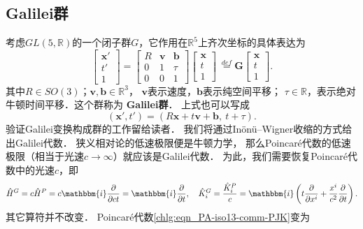\subsection{Galilei群}\label{chlg:sec_Galilei-group}
考虑$GL(5, \mathbb{R})$的一个闭子群$G$，它作用在$\mathbb{R}^5$上齐次坐标的具体表达为
\begin{equation}\label{chlg:eqn_Galilei-max}
    \begin{bmatrix}  \boldsymbol{x}' \\ t'\\ 1 \end{bmatrix} =
    \begin{bmatrix}  R & \boldsymbol{v} & \boldsymbol{b} \\0 & 1 & \tau \\ 0 &0 & 1  \end{bmatrix}
    \begin{bmatrix}  \boldsymbol{x} \\t\\ 1 \end{bmatrix} 
    \  \overset{def}{=} \boldsymbol{G} \begin{bmatrix}  \boldsymbol{x} \\ t\\ 1 \end{bmatrix} .
\end{equation}
其中$R \in S O(3)$；$\boldsymbol{v}, \boldsymbol{b} \in \mathbb{R}^3$，
$\boldsymbol{v}$表示速度，$\boldsymbol{b}$表示纯空间平移；
$\tau \in \mathbb{R}$，表示绝对牛顿时间平移．这个群称为 {\heiti\bfseries Galilei群}．
上式也可以写成
\begin{equation}
    (\boldsymbol{x}', t') = (R \boldsymbol{x}+t \boldsymbol{v}+ \boldsymbol{b},\ t+\tau) .
\end{equation}
验证Galilei变换构成群的工作留给读者．
我们将通过In\"on\"u--Wigner{\kaishu 收缩}的方式给出Galilei代数．
狭义相对论的低速极限便是牛顿力学，
那么Poincar\'{e}代数的低速极限（相当于光速$c\to \infty$）就应该是Galilei代数．
为此，我们需要恢复Poincar\'{e}代数中的光速$c$，即
\begin{equation}
    \hat{H}^G =c\hat{H}^P = c\mathbbm{i}\frac{\partial }{ \partial ct }
    = \mathbbm{i}\frac{\partial }{ \partial t }, \quad
    \hat{K}_i^G = \frac{\hat{K}_i^P}{c}= \mathbbm{i} \left(t\frac{\partial }{\partial x^i}+  
    \frac{x^i}{c^2}\frac{\partial }{\partial t}\right) .
\end{equation}
其它算符并不改变．
Poincar\'{e}代数\eqref{chlg:eqn_PA-iso13-comm-PJK}变为
